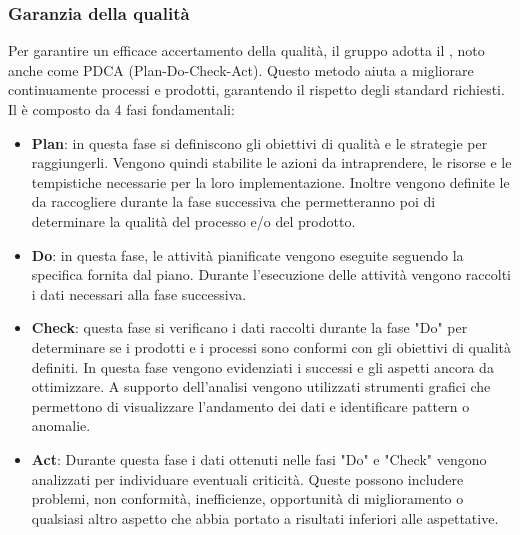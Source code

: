 \subsubsection{Garanzia della qualità}
Per garantire un efficace accertamento della qualità, il gruppo adotta il , noto anche come PDCA (Plan-Do-Check-Act). 
Questo metodo aiuta a migliorare continuamente processi e prodotti, garantendo il rispetto degli standard richiesti.
Il  è composto da 4 fasi fondamentali:
\begin{itemize}
    \item \textbf{Plan}: in questa fase si definiscono gli obiettivi di qualità e le strategie per raggiungerli. 
    Vengono quindi stabilite le azioni da intraprendere, le risorse e le tempistiche necessarie per la loro implementazione. 
    Inoltre vengono definite le  da raccogliere durante la fase successiva che permetteranno poi di determinare la qualità del processo e/o del prodotto.

    \item \textbf{Do}: in questa fase, le attività pianificate vengono eseguite seguendo la specifica fornita dal piano.
    Durante l'esecuzione delle attività vengono raccolti i dati necessari alla fase successiva.
    

    \item \textbf{Check}: questa fase si verificano i dati raccolti durante la fase "Do" per determinare se i prodotti e i processi sono conformi con gli obiettivi di qualità definiti.
    In questa fase vengono evidenziati i successi e gli aspetti ancora da ottimizzare.
    A supporto dell'analisi vengono utilizzati strumenti grafici che permettono di visualizzare l'andamento dei dati e identificare pattern o anomalie.

    \item \textbf{Act}: Durante questa fase i dati ottenuti nelle fasi "Do" e "Check" vengono analizzati per individuare eventuali criticità.
    Queste possono includere problemi, non conformità, inefficienze, opportunità di miglioramento o qualsiasi altro aspetto che abbia portato a risultati inferiori alle aspettative.
    
\end{itemize}

